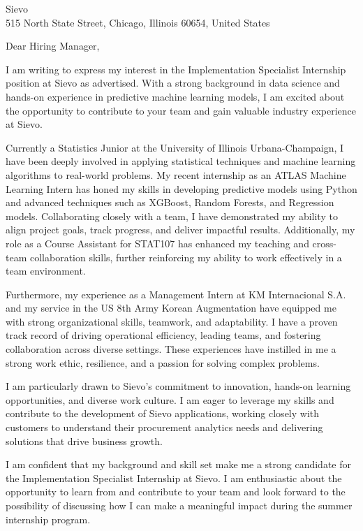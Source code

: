 \documentclass{letter}
\begin{document}
\begin{letter}{Sievo\\
515 North State Street, Chicago, Illinois 60654, United States\\
}


\opening{Dear Hiring Manager,}


I am writing to express my interest in the Implementation Specialist Internship position at Sievo as advertised. With a strong background in data science and hands-on experience in predictive machine learning models, I am excited about the opportunity to contribute to your team and gain valuable industry experience at Sievo.

Currently a Statistics Junior at the University of Illinois Urbana-Champaign, I have been deeply involved in applying statistical techniques and machine learning algorithms to real-world problems. My recent internship as an ATLAS Machine Learning Intern has honed my skills in developing predictive models using Python and advanced techniques such as XGBoost, Random Forests, and Regression models. Collaborating closely with a team, I have demonstrated my ability to align project goals, track progress, and deliver impactful results. Additionally, my role as a Course Assistant for STAT107 has enhanced my teaching and cross-team collaboration skills, further reinforcing my ability to work effectively in a team environment.

Furthermore, my experience as a Management Intern at KM Internacional S.A. and my service in the US 8th Army Korean Augmentation have equipped me with strong organizational skills, teamwork, and adaptability. I have a proven track record of driving operational efficiency, leading teams, and fostering collaboration across diverse settings. These experiences have instilled in me a strong work ethic, resilience, and a passion for solving complex problems.

I am particularly drawn to Sievo's commitment to innovation, hands-on learning opportunities, and diverse work culture. I am eager to leverage my skills and contribute to the development of Sievo applications, working closely with customers to understand their procurement analytics needs and delivering solutions that drive business growth.

I am confident that my background and skill set make me a strong candidate for the Implementation Specialist Internship at Sievo. I am enthusiastic about the opportunity to learn from and contribute to your team and look forward to the possibility of discussing how I can make a meaningful impact during the summer internship program.


\end{letter}
\end{document}
